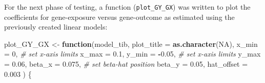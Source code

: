 \documentclass[
]{article}
\newenvironment{Shaded}{\begin{snugshade}}{\end{snugshade}}
\newcommand{\AttributeTok}[1]{\textcolor[rgb]{0.13,0.29,0.53}{#1}}
\newcommand{\CommentTok}[1]{\textcolor[rgb]{0.56,0.35,0.01}{\textit{#1}}}
\newcommand{\ConstantTok}[1]{\textcolor[rgb]{0.56,0.35,0.01}{#1}}
\newcommand{\ControlFlowTok}[1]{\textcolor[rgb]{0.13,0.29,0.53}{\textbf{#1}}}
\newcommand{\DecValTok}[1]{\textcolor[rgb]{0.00,0.00,0.81}{#1}}
\newcommand{\FloatTok}[1]{\textcolor[rgb]{0.00,0.00,0.81}{#1}}
\newcommand{\FunctionTok}[1]{\textcolor[rgb]{0.13,0.29,0.53}{\textbf{#1}}}
\newcommand{\NormalTok}[1]{#1}
\newcommand{\OtherTok}[1]{\textcolor[rgb]{0.56,0.35,0.01}{#1}}
\newcommand{\SpecialCharTok}[1]{\textcolor[rgb]{0.81,0.36,0.00}{\textbf{#1}}}
\begin{document}
\leavevmode\newline For the next phase of testing, a function (\texttt{plot\_GY\_GX}) was written to plot the coefficients for gene-exposure versus gene-outcome as estimated using the previously created linear models:

\begin{Shaded}
\begin{Highlighting}[]
\NormalTok{plot\_GY\_GX }\OtherTok{\textless{}{-}} \ControlFlowTok{function}\NormalTok{(model\_tib, }
                       \AttributeTok{plot\_title =} \FunctionTok{as.character}\NormalTok{(}\ConstantTok{NA}\NormalTok{),}
                       \AttributeTok{x\_min =} \DecValTok{0}\NormalTok{,                     }\CommentTok{\# set x{-}axis limits}
                       \AttributeTok{x\_max =} \FloatTok{0.1}\NormalTok{,}
                       \AttributeTok{y\_min =} \SpecialCharTok{{-}}\FloatTok{0.05}\NormalTok{,                 }\CommentTok{\# set x{-}axis limits}
                       \AttributeTok{y\_max =} \FloatTok{0.06}\NormalTok{,}
                       \AttributeTok{beta\_x =} \FloatTok{0.075}\NormalTok{,                }\CommentTok{\# set beta{-}hat position}
                       \AttributeTok{beta\_y =} \FloatTok{0.05}\NormalTok{,}
                       \AttributeTok{hat\_offset =} \FloatTok{0.003}
\NormalTok{)}
\NormalTok{\{}
  

\end{Highlighting}
\end{Shaded}
\end{document}
